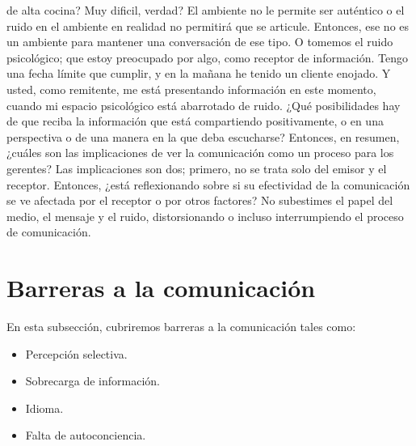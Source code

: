 \documentclass[10pt]{book}
\begin{document}
de alta cocina? Muy dificil, verdad? El ambiente no le permite ser auténtico o el ruido en el ambiente en realidad no permitirá que se articule. Entonces, ese no es un ambiente para mantener una conversación de ese tipo. O tomemos el ruido psicológico; que estoy preocupado por algo, como receptor de información. Tengo una fecha límite que cumplir, y en la mañana he tenido un cliente enojado. Y usted, como remitente, me está presentando información en este momento, cuando mi espacio psicológico está abarrotado de ruido. ¿Qué posibilidades hay de que reciba la información que está compartiendo positivamente, o en una perspectiva o de una manera en la que deba escucharse? Entonces, en resumen, ¿cuáles son las implicaciones de ver la comunicación como un proceso para los gerentes? Las implicaciones son dos; primero, no se trata solo del emisor y el receptor. Entonces, ¿está reflexionando sobre si su efectividad de la comunicación se ve afectada por el receptor o por otros factores? No subestimes el papel del medio, el mensaje y el ruido, distorsionando o incluso interrumpiendo el proceso de comunicación.
\section{Barreras a la comunicación}
En esta subsección, cubriremos barreras a la comunicación tales como:
\begin{itemize}
\item Percepción selectiva.
\item Sobrecarga de información.
\item Idioma.
\item Falta de autoconciencia.
\end{itemize}
\end{document}
